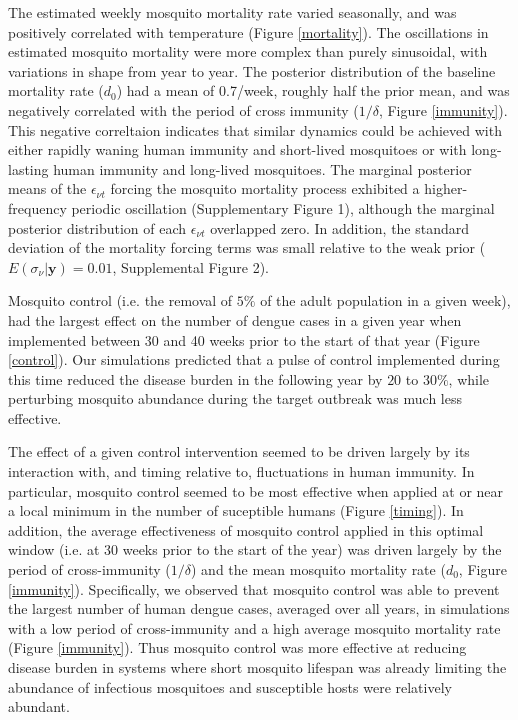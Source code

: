 \documentclass[10pt,letterpaper]{article}
\begin{document}
The estimated weekly mosquito mortality rate varied seasonally, and was positively correlated with temperature (Figure \ref{mortality}).
The oscillations in estimated mosquito mortality were more complex than purely sinusoidal, with variations in shape from year to year.
The posterior distribution of the baseline mortality rate ($d_0$) had a mean of 0.7/week, roughly half the prior mean, and was negatively correlated with the period of cross immunity ($1/\delta$, Figure \ref{immunity}).
This negative correltaion indicates that similar dynamics could be achieved with either rapidly waning human immunity and short-lived mosquitoes or with long-lasting human immunity and long-lived mosquitoes.
The marginal posterior means of the $\epsilon_{\nu t}$ forcing the mosquito mortality process exhibited a higher-frequency periodic oscillation (Supplementary Figure 1), although the marginal posterior distribution of each $\epsilon_{\nu t}$ overlapped zero.
In addition, the standard deviation of the mortality forcing terms was small relative to the weak prior ($E(\sigma_{\nu}|\mathbf{y}) = 0.01$, Supplemental Figure 2).

Mosquito control (i.e. the removal of $5\%$ of the adult population in a given week), had the largest effect on the number of dengue cases in a given year when implemented between 30 and 40 weeks prior to the start of that year (Figure \ref{control}).
Our simulations predicted that a pulse of control implemented during this time reduced the disease burden in the following year by $20$ to $30\%$, while perturbing mosquito abundance during the target outbreak was much less effective.

The effect of a given control intervention seemed to be driven largely by its interaction with, and timing relative to, fluctuations in human immunity.
In particular, mosquito control seemed to be most effective when applied at or near a local minimum in the number of suceptible humans (Figure \ref{timing}).
In addition, the average effectiveness of mosquito control applied in this optimal window (i.e. at 30 weeks prior to the start of the year) was driven largely by the period of cross-immunity ($1/\delta$) and the mean mosquito mortality rate ($d_0$, Figure \ref{immunity}).
Specifically, we observed that mosquito control was able to prevent the largest number of human dengue cases, averaged over all years, in simulations with a low period of cross-immunity and a high average mosquito mortality rate (Figure \ref{immunity}). 
Thus mosquito control was more effective at reducing disease burden in systems where short mosquito lifespan was already limiting the abundance of infectious mosquitoes and susceptible hosts were relatively abundant.
\end{document}

